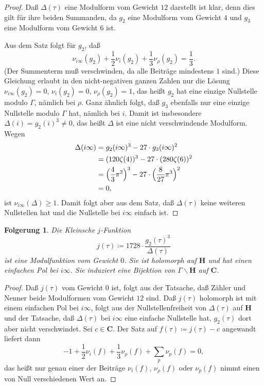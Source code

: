 \documentclass[a4paper,twoside,openright]{report}
\newtheorem{cor}[thm]{Folgerung}
\theoremstyle{definition}
\theoremstyle{remark}
\begin{document}
\begin{proof}
  Daß $\Delta(\tau)$ eine Modulform vom Gewicht $12$ darstellt ist klar, denn dies
  gilt für ihre beiden Summanden, da $g_2$ eine Modulform vom Gewicht $4$ und
  $g_3$ eine Modulform vom Gewicht $6$ ist.

  Aus dem Satz folgt für $g_2$, daß
  \[
    \nu_{i\infty}(g_2) + \frac 1 2 \nu_i(g_2) + \frac 1 3 \nu_\rho(g_2) = \frac 1 3.
  \]
  (Der Summenterm muß verschwinden, da alle Beiträge mindestens $1$ sind.)
  Diese Gleichung erlaubt in den nicht-negativen ganzen Zahlen nur die Lösung
  $\nu_{i\infty}(g_2) = 0$, $\nu_i(g_2) = 0$, $\nu_\rho(g_2) = 1$, das heißt
  $g_2$ hat eine einzige Nullstelle modulo $\Gamma$, nämlich bei $\rho$. Ganz
  ähnlich folgt, daß $g_3$ ebenfalls nur eine einzige Nullstelle modulo $\Gamma$
  hat, nämlich bei $i$. Damit ist insbesondere $\Delta(i) = g_2(i)^3 \neq 0$,
  das heißt $\Delta$ ist eine nicht verschwindende Modulform. Wegen
  \[
    \begin{split}
      \Delta(i\infty) & = g_2(i\infty)^3 - 27 \cdot g_3(i\infty)^2
      \\
      & = (120 \zeta(4))^3 - 27 \cdot (280 \zeta(6))^2
      \\
      & = \Bigl(\frac 4 3 \pi^2\Bigr)^3 - 27 \cdot \Bigl(\frac 8 {27} \pi^3\Bigr)^2
      \\
      & = 0,
    \end{split}
  \]
  ist $\nu_{i\infty}(\Delta) \ge 1$. Damit folgt aber aus dem Satz, daß
  $\Delta(\tau)$ keine weiteren Nullstellen hat und die Nullstelle
  bei $i\infty$ einfach ist.
\end{proof}

\begin{cor}
  Die Kleinsche $j$-Funktion
  \[
    j(\tau) \coloneqq 1728 \cdot \frac{g_2(\tau)^3}{\Delta(\tau)}
  \]
  ist eine Modulfunktion vom Gewicht $0$. Sie ist holomorph auf $\mathbf H$ und
  hat einen einfachen Pol bei $i\infty$. Sie induziert eine
  Bijektion von $\Gamma\backslash \mathbf H$ auf $\mathbf C$.
\end{cor}

\begin{proof}
  Daß $j(\tau)$ vom Gewicht $0$ ist, folgt aus der Tatsache, daß
  Zähler und Nenner beide Modulformen vom Gewicht $12$ sind. Daß $j(\tau)$ holomorph
  ist mit einem einfachen Pol bei $i\infty$, folgt aus der Nullstellenfreiheit von $\Delta(\tau)$ auf $\mathbf H$
  und der Tatsache, daß $\Delta(\tau)$ bei $i\infty$ eine einfache Nullstelle
  hat, $g_2(\tau)$ dort aber nicht verschwindet.
  Sei $c \in \mathbf C$. Der Satz auf $f(\tau) \coloneqq j(\tau) - c$ angewandt liefert dann
  \[
    -1 + \frac 1 2 \nu_i(f) + \frac 1 3 \nu_\rho(f) + \sum_p \nu_p(f) = 0,
  \]
  das heißt nur genau einer der Beiträge $\nu_i(f)$, $\nu_\rho(f)$ oder $\nu_p(f)$ nimmt
  einen von Null verschiedenen Wert an.
\end{proof}
\end{document}
